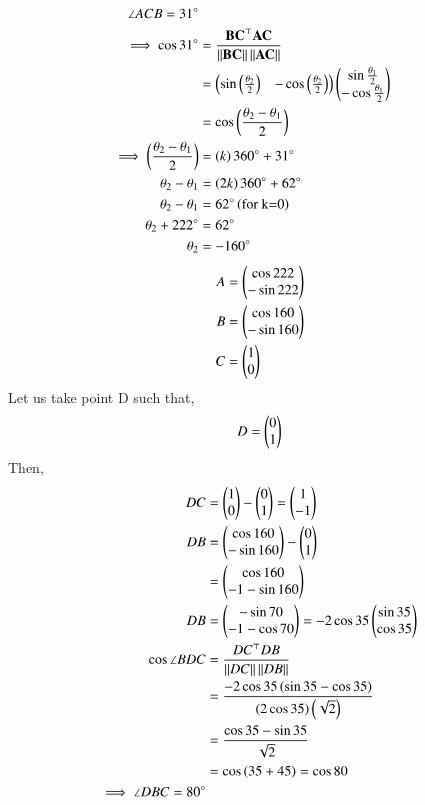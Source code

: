 \documentclass[journal,12pt,twocolumn]{IEEEtran}
\begin{document}
\begin{enumerate}
		\begin{align}
			\angle ACB = 31 \degree \\
			\implies \cos 31 \degree &=  \frac{\mathbf{BC}^{\top}\mathbf{AC}}{\left\lVert\mathbf{BC}\right\rVert\left\lVert\mathbf{AC}\right\rVert}\\ 
						 &= \begin{pmatrix}\sin \left(\frac{\theta_2}{2}\right)&-\cos \left(\frac{\theta_2}{2}\right)\end{pmatrix}\begin{pmatrix}\sin \frac{\theta_1}{2} \\ -\cos \frac{\theta_1}{2}\end{pmatrix}\\
						 &= \cos \left(\frac{\theta_2-\theta_1}{2}\right)\\
			\implies \left(\frac{\theta_2-\theta_1}{2}\right) &= \left(k\right)360\degree +31\degree\\
			       \theta_2-\theta_1 &= \left(2k\right)360\degree + 62\degree\\ 
			       \theta_2-\theta_1 &= 62\degree \left(\text{for k=0}\right)\\
			       \theta_2+222\degree &= 62\degree\\
			       \theta_2 &= -160\degree 
		\end{align}
		\begin{align}
			A &= \begin{pmatrix}\cos 222\\ -\sin 222\end{pmatrix}\\
			B &= \begin{pmatrix}\cos 160\\ -\sin 160\end{pmatrix}\\
			C &= \begin{pmatrix}1\\0\end{pmatrix}
		\end{align}
		Let us take point D such that,
		\begin{align}
			D = \begin{pmatrix}0\\1\end{pmatrix}
		\end{align}
		Then,
		\begin{align}
			DC &= \begin{pmatrix}1\\0\end{pmatrix}-\begin{pmatrix}0\\1\end{pmatrix} = \begin{pmatrix}1\\-1\end{pmatrix}\\
			DB &= \begin{pmatrix}\cos 160\\ -\sin 160\end{pmatrix} - \begin{pmatrix}0\\1\end{pmatrix}\\
			   &= \begin{pmatrix}\cos 160\\ -1-\sin 160\end{pmatrix}\\
			DB &= \begin{pmatrix}-\sin 70\\ -1-\cos 70\end{pmatrix} = -2\cos 35 \begin{pmatrix}\sin 35\\ \cos35\end{pmatrix}\\
			\cos \angle BDC &= \frac{DC^{\top}DB}{\left\lVert DC\right\rVert\left\lVert DB\right\rVert}\\
					&= \frac{-2\cos 35 \left(\sin 35 - \cos 35\right)}{\left(2\cos 35\right)\left(\sqrt{2}\right)}\\
					&= \frac{\cos 35 - \sin 35}{\sqrt{2}}\\
					&= \cos \left(35+45\right) = \cos 80\\
			\implies \angle DBC = 80 \degree
		\end{align}

\end{enumerate}
\end{document}
